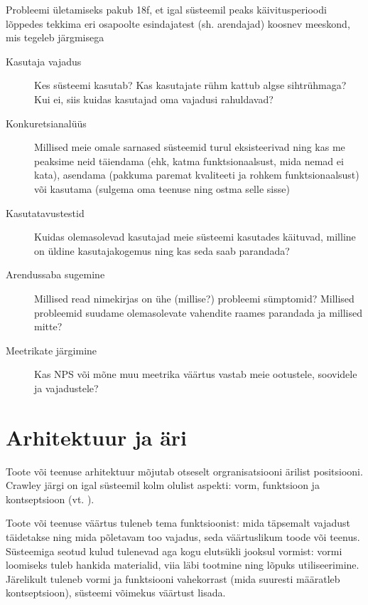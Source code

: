 \documentclass{tufte-book}
\begin{document}
Probleemi ületamiseks pakub 18f, et igal süsteemil peaks käivitusperioodi lõppedes tekkima eri osapoolte esindajatest (sh. arendajad) koosnev meeskond, mis tegeleb järgmisega
\begin{description}
	\item[Kasutaja vajadus] Kes süsteemi kasutab? Kas kasutajate rühm kattub algse sihtrühmaga? Kui ei, siis kuidas kasutajad oma vajadusi rahuldavad?
	\item[Konkuretsianalüüs] Millised meie omale sarnased süsteemid turul eksisteerivad ning kas me peaksime neid täiendama (ehk, katma funktsionaalsust, mida nemad ei kata), asendama (pakkuma paremat kvaliteeti ja rohkem funktsionaalsust) või kasutama (sulgema oma teenuse ning ostma selle sisse)
	\item[Kasutatavustestid] Kuidas olemasolevad kasutajad meie süsteemi kasutades käituvad, milline on üldine kasutajakogemus ning kas seda saab parandada?
	\item[Arendussaba sugemine] Millised read nimekirjas on ühe (millise?) probleemi sümptomid? Millised probleemid suudame olemasolevate vahendite raames parandada ja millised mitte?
	\item[Meetrikate järgimine] Kas NPS või mõne muu meetrika väärtus vastab meie ootustele, soovidele ja vajadustele?
\end{description}

\section{Arhitektuur ja äri}
Toote või teenuse arhitektuur mõjutab otseselt orgranisatsiooni ärilist positsiooni. Crawley järgi on igal süsteemil kolm olulist aspekti: vorm, funktsioon ja kontseptsioon (vt. ).

Toote või teenuse väärtus tuleneb tema funktsioonist: mida täpsemalt vajadust täidetakse ning mida põletavam too vajadus, seda väärtuslikum toode või teenus. Süsteemiga seotud kulud tulenevad aga kogu elutsükli jooksul vormist: vormi loomiseks tuleb hankida materialid, viia läbi tootmine ning lõpuks utiliseerimine. Järelikult tuleneb vormi ja funktsiooni vahekorrast (mida suuresti määratleb kontseptsioon), süsteemi võimekus väärtust lisada. 
\end{document}
